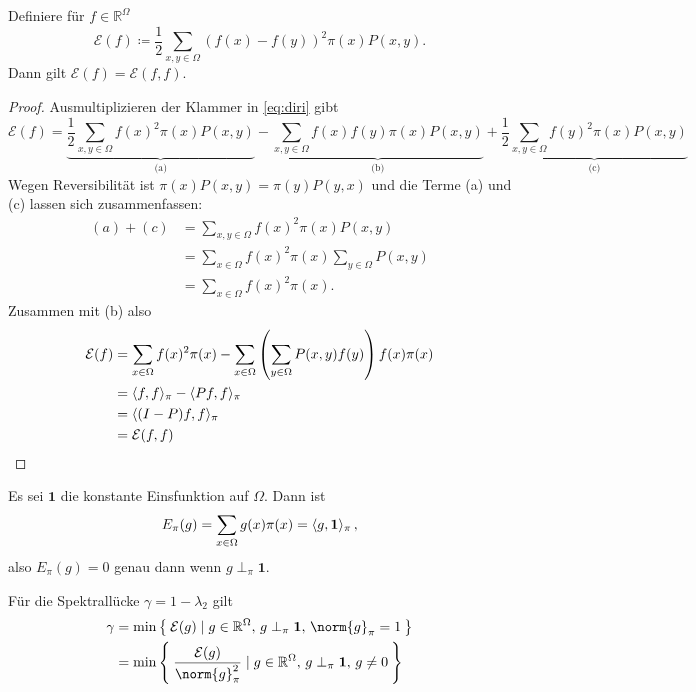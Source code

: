 \documentclass[ngerman,a4paper,11pt]{scrartcl}
\newcommand{\diri}{\mathcal{E}}
\newcommand{\RR}{\mathbb{R}}
\DeclarePairedDelimiter{\sprod}{\langle}{\rangle}	%
\begin{document}
\begin{lem}
 Definiere für $f\in\RR^\Omega$
 \begin{equation}
  \label{eq:diri}
  \diri(f)\coloneqq\frac{1}{2}\sum_{x,y\in\Omega}(f(x)-f(y))^2\pi(x)P(x,y).
 \end{equation}
 Dann gilt $\diri(f)=\diri(f,f)$.
\end{lem}
\begin{proof}
  Ausmultiplizieren der Klammer in \cref{eq:diri} gibt
  \begin{equation*}
   \diri(f)=\underbrace{\frac{1}{2}\sum_{x,y\in\Omega}f(x)^2\pi(x)P(x,y)}_{\text{(a)}}-
   \underbrace{\sum_{x,y\in\Omega}f(x)f(y)\pi(x)P(x,y)}_{\text{(b)}}
   +\underbrace{\frac{1}{2}\sum_{x,y\in\Omega}f(y)^2\pi(x)P(x,y)}_{\text{(c)}}
  \end{equation*}
  Wegen Reversibilität ist $\pi(x)P(x,y)=\pi(y)P(y,x)$ und die Terme (a) und (c)
  lassen sich zusammenfassen:
  \begin{align*}
   (a)+(c)&=\sum_{x,y\in\Omega}f(x)^2\pi(x)P(x,y) \\
   &=\sum_{x\in\Omega}f(x)^2\pi(x)\sum_{y\in\Omega}P(x,y) \\
   &=\sum_{x\in\Omega}f(x)^2\pi(x).
  \end{align*}
  Zusammen mit (b) also
  \begin{align*}
   \diri(f)&=\sum_{x\in\Omega}f(x)^2\pi(x)-\sum_{x\in\Omega}\left(\sum_{y\in\Omega}P(x,y)f(y) \right)f(x)\pi(x) \\
   &=\sprod{f,f}_\pi-\sprod{Pf,f}_\pi \\
   &=\sprod{(I-P)f,f}_\pi \\
   &=\diri(f,f)
  \end{align*}
\end{proof}

\begin{rem}
 Es sei $\mathbf{1}$ die
 konstante Einsfunktion auf $\Omega$. Dann
 ist
 \begin{equation*}
  E_\pi(g)=\sum_{x\in\Omega}g(x)\pi(x)=\sprod{g,\mathbf{1}}_\pi\, ,
 \end{equation*}
 also $E_\pi(g)=0$ genau dann wenn $g\perp_\pi\mathbf{1}$.
\end{rem}

\begin{lem}
 \label{lem:spekdiri}
 Für die Spektrallücke $\gamma=1-\lambda_2$  gilt
 \begin{align}
  \gamma&=\min\Set{\diri(g)\mid g\in\RR^{\Omega} , \, g\perp_\pi\mathbf{1} , \, \norm{g}_\pi=1} \label{eq:min} \\
        &=\min\Set{\frac{\diri(g)}{\norm{g}_\pi^2}\mid g\in\RR^\Omega,\, g\perp_\pi\mathbf{1},\, g\neq 0} \label{eq:min2}
 \end{align}
\end{lem}
\end{document}
